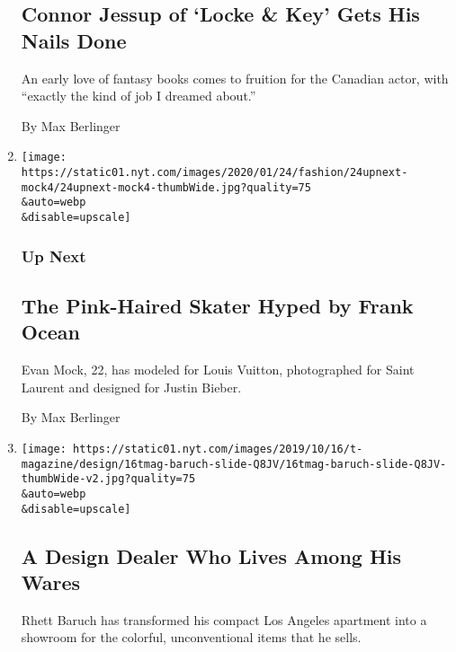 \begin{enumerate}
  \hypertarget{connor-jessup-of-locke--key-gets-his-nails-done}{%
  \subsection{Connor Jessup of `Locke \& Key' Gets His Nails
  Done}\label{connor-jessup-of-locke--key-gets-his-nails-done}}

  An early love of fantasy books comes to fruition for the Canadian
  actor, with ``exactly the kind of job I dreamed about.''

  By Max Berlinger
\item
  \href{/2020/01/24/fashion/mens-style/evan-mock-frank-ocean.html}{}

  \texttt{[image: https://static01.nyt.com/images/2020/01/24/fashion/24upnext-mock4/24upnext-mock4-thumbWide.jpg?quality=75\\\&auto=webp\\\&disable=upscale]}

  \hypertarget{up-next}{%
  \subsubsection{Up Next}\label{up-next}}

  \hypertarget{the-pink-haired-skater-hyped-by-frank-ocean}{%
  \subsection{The Pink-Haired Skater Hyped by Frank
  Ocean}\label{the-pink-haired-skater-hyped-by-frank-ocean}}

  Evan Mock, 22, has modeled for Louis Vuitton, photographed for Saint
  Laurent and designed for Justin Bieber.

  By Max Berlinger
\item
  \href{/2019/12/04/t-magazine/rhett-baruch.html}{}

  \texttt{[image: https://static01.nyt.com/images/2019/10/16/t-magazine/design/16tmag-baruch-slide-Q8JV/16tmag-baruch-slide-Q8JV-thumbWide-v2.jpg?quality=75\\\&auto=webp\\\&disable=upscale]}

  \hypertarget{a-design-dealer-who-lives-among-his-wares}{%
  \subsection{A Design Dealer Who Lives Among His
  Wares}\label{a-design-dealer-who-lives-among-his-wares}}

  Rhett Baruch has transformed his compact Los Angeles apartment into a
  showroom for the colorful, unconventional items that he sells.


\end{enumerate}

